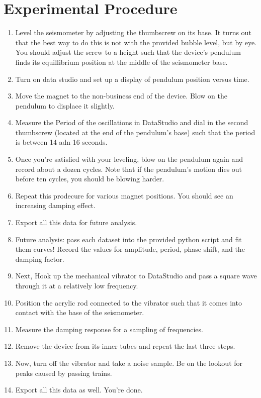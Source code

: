 \documentclass{amsart}
\begin{document}
\section{Experimental Procedure}

\begin{enumerate}
    \item Level the seismometer by adjusting the thumbscrew on its base. It turns out that the best way to do this is not with the provided bubble level, but by eye. You should  adjust the screw to a height such that the device's pendulum finds its equillibrium position at the middle of the seismometer base.
    \item Turn on data studio and set up a display of pendulum position versus time.
    \item Move the magnet to the non-business end of the device. Blow on the pendulum to displace it slightly.
    \item Measure the Period of the oscillations in DataStudio and dial in the second thumbscrew (located at the end of the pendulum's base) such that the period is between 14 adn 16 seconds.
    \item Once you're satisfied with your leveling, blow on the pendulum again and record about a dozen cycles. Note that if the pendulum's motion dies out before ten cycles, you should be blowing harder.
    \item Repeat this prodecure for various magnet positions. You should see an increasing damping effect.
    \item Export all this data for future analysis.
    \item Future analysis: pass each dataset into the provided python script and fit them curves! Record the values for amplitude, period, phase shift, and the damping factor.
    \item Next, Hook up the mechanical vibrator to DataStudio and pass a square wave through it at a relatively low frequency.
    \item Position the acrylic rod connected to the vibrator such that it comes into contact with the base of the seismometer.
    \item Measure the damping response for a sampling of frequencies.
    \item Remove the device from its inner tubes and repeat the last three steps.
    \item Now, turn off the vibrator and take a noise sample. Be on the lookout for peaks caused by passing trains.
    \item Export all this data as well. You're done.
\end{enumerate}
\end{document}
